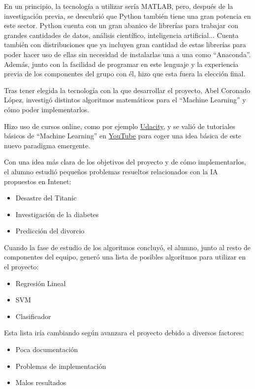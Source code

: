 En un principio, la tecnología a utilizar sería MATLAB, pero, después de la investigación previa, se descubrió que Python también tiene una gran potencia en este sector. Python cuenta con un gran abanico de librerías para trabajar con grandes cantidades de datos, análisis científico, inteligencia artificial... Cuenta también con distribuciones que ya incluyen gran cantidad de estas librerías para poder hacer uso de ellas sin necesidad de instalarlas una a una como ``Anaconda''. Además, junto con la facilidad de programar en este lenguaje y la experiencia previa de los componentes del grupo con él, hizo que esta fuera la elección final.

Tras tener elegida la tecnología con la que desarrollar el proyecto, Abel Coronado López, investigó distintos algoritmos matemáticos para el ``Machine Learning'' y cómo poder implementarlos.

Hizo uso de cursos online, como por ejemplo \href{https://www.udacity.com}{Udacity}, y se valió de tutoriales básicos de ``Machine Learning'' en \href{https://www.youtube.com}{YouTube} para coger una idea básica de este nuevo paradigma emergente.

Con una idea más clara de los objetivos del proyecto y de cómo implementarlos, el alumno estudió pequeños problemas resueltos relacionados con la IA propuestos en Intenet:

\begin{itemize}
\item Desastre del Titanic
\item Investigación de la diabetes
\item Predicción del divorcio
\end{itemize}

Cuando la fase de estudio de los algoritmos concluyó, el alumno, junto al resto de componentes del equipo, generó una lista de posibles algoritmos para utilizar en el proyecto: 

\begin{itemize}
\item Regresión Lineal
\item SVM
\item Clasificador
\end{itemize}

Esta lista iría cambiando según avanzara el proyecto debido a diversos factores:

\begin{itemize}
\item Poca documentación
\item Problemas de implementación
\item Malos resultados
\end{itemize}

